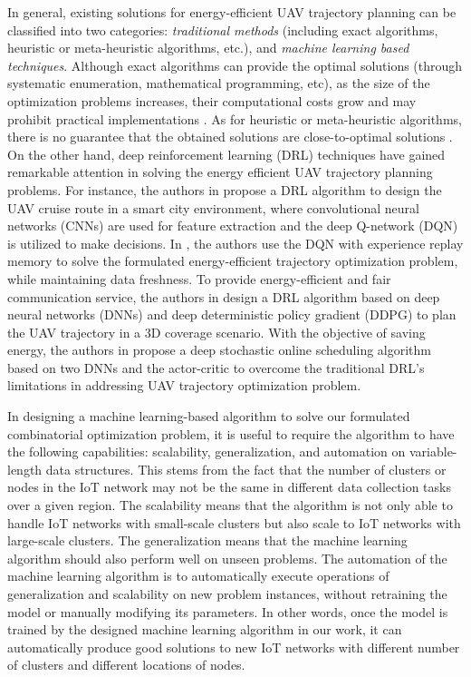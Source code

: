 \documentclass[journal]{IEEEtran}
\begin{document}
     In  general,  existing solutions for energy-efficient UAV trajectory planning can be classified into two categories: \emph{traditional methods} (including exact algorithms, heuristic or meta-heuristic algorithms, etc.), and \emph{machine learning based techniques}. Although exact algorithms can provide the optimal solutions (through systematic enumeration, mathematical programming, etc), as the size of the optimization problems increases, their computational costs grow and may prohibit practical implementations \cite{D. Rojas-Viloria}. As for heuristic or meta-heuristic algorithms, there is no guarantee that the obtained solutions are close-to-optimal solutions \cite{K. Zhu}. On the other hand, deep reinforcement learning (DRL) techniques have gained remarkable attention in solving the energy efficient UAV trajectory planning problems. For instance, the authors in \cite{B. Zhang} propose a DRL algorithm to design the UAV cruise route in  a smart city environment, where convolutional neural networks (CNNs) are used for feature extraction and the deep Q-network (DQN) is utilized to make decisions. In \cite{S. F. Abedin}, the authors use the DQN with experience replay memory to solve the formulated energy-efficient trajectory optimization problem, while maintaining data freshness. To provide energy-efficient and fair communication service, the authors in \cite{R. Ding} design a DRL algorithm based on deep neural networks (DNNs) and deep deterministic policy gradient (DDPG) to plan the UAV trajectory in a 3D coverage scenario. With the objective of saving energy, the authors in \cite{Y. Yuan} propose a deep stochastic online scheduling algorithm based on two DNNs and the actor-critic to overcome the traditional DRL's limitations in addressing UAV trajectory optimization problem.


     {In designing a machine learning-based algorithm to solve our formulated combinatorial optimization problem, it is useful to require the algorithm to have the following capabilities: scalability, generalization, and automation on variable-length data structures. This stems from the fact that the number of clusters or nodes in the IoT network may not be the same in different data collection tasks over a given region. The scalability means  that the algorithm is not only able to handle IoT networks with small-scale clusters but also scale to IoT networks with large-scale clusters. The generalization means that the machine learning algorithm should also perform well on unseen problems. The automation of the machine learning algorithm is to automatically execute operations of generalization and scalability on new problem instances, without retraining the model or manually modifying its parameters. In other words, once the model is trained by the designed machine learning algorithm in our work, it can automatically produce good solutions to new IoT networks with different number of clusters and different locations of nodes.}
\end{document}
